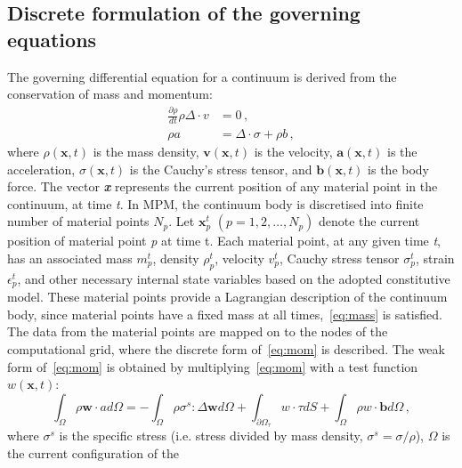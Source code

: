\subsection{Discrete formulation of the governing equations}
The governing differential equation for a continuum is derived from the 
conservation of mass and momentum:
\begin{align}
\label{eq:mass}
\frac{\partial \rho}{dt}\rho \Delta \cdot \mathbf{\mathit{v}} & = 0 \,, \\   
 \label{eq:mom}
 \rho a & = \Delta \cdot \sigma + \rho \mathbf{\mathit{b}} \,,
\end{align}
where $\rho (\mathbf{x},t)$ is the mass density, $\mathit{\mathbf{v}} 
(\mathbf{x},t)$ is the velocity,  $\mathit{\mathbf{a}} (\mathbf{x},t)$ is the 
acceleration,  $\sigma (\mathbf{x},t)$ is the Cauchy's stress tensor, and  
$\mathit{\mathbf{b}} (\mathbf{x},t)$ is the body force. The vector 
\textbf{\textit{x}} represents the current position of any material point in 
the continuum, at time \textit{t}. In MPM, the continuum body is discretised 
into finite number of material points $\mathit{N}_{p}$. Let 
$\mathit{\mathbf{x}}_{p}^{t}$ $(\mathit{p}=1,2,\dots,\mathit{N}_{p})$ denote 
the current position of material point \textit{p} at time t.
Each material point, at any given time \textit{t}, has an associated mass 
$\mathit{m}_{p}^{t}$, density $\rho_{p}^{t}$, velocity 
$\mathbf{\mathit{v}}_{p}^{t}$, Cauchy stress tensor $\sigma_{p}^{t}$, strain 
$\epsilon_{p}^{t}$, and other necessary internal state variables based on the 
adopted constitutive model. These material points provide a Lagrangian 
description of the continuum body, since material points have a fixed mass at 
all times,~\cref{eq:mass} is satisfied. The data from the material points 
are mapped on to the nodes of the computational grid, where the discrete form 
of~\cref{eq:mom} is described. The weak form of~\cref{eq:mom} is 
obtained 
by multiplying~\cref{eq:mom} with a test function 
$\mathbf{\mathit{w}}(\mathbf{x},t)$:
\begin{equation}
\int_{\Omega}\rho \mathit{\mathbf{w}} \cdot \mathbf{\mathit{a}} 
\mathit{d}\Omega = - \int_{\Omega} \rho {\sigma}^{s} : \Delta 
\mathit{\mathbf{w}} \mathit{d}\Omega + \int_{{\partial \Omega}_{\tau}} 
\mathbf{\mathit{w}} \cdot \tau \mathit{d} \mathit{S} + \int_{\Omega}\rho 
\mathbf{\mathit{w}} \cdot \mathbf{b} \mathit{d} \Omega \,,
\label{eq:weak}
\end{equation}
where $\sigma^{s}$ is the specific stress (i.e. stress divided by mass density, 
$\sigma^{s} = \sigma / \rho$), $\Omega$ is the current configuration of the 
